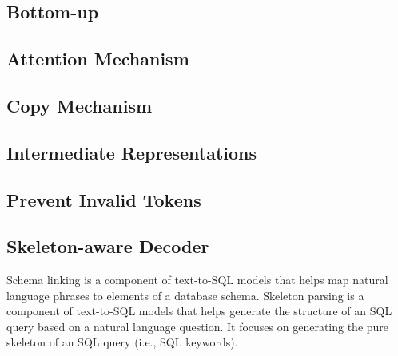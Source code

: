 \subsection{Bottom-up}

\subsection{Attention Mechanism}

\subsection{Copy Mechanism}

\subsection{Intermediate Representations}

\subsection{Prevent Invalid Tokens}

\subsection{Skeleton-aware Decoder}

Schema linking is a component of text-to-SQL models that helps map natural language phrases to elements of a database schema.
Skeleton parsing is a component of text-to-SQL models that helps generate the structure of an SQL query based on a natural language question. It focuses on generating the pure skeleton of an SQL query (i.e., SQL keywords).